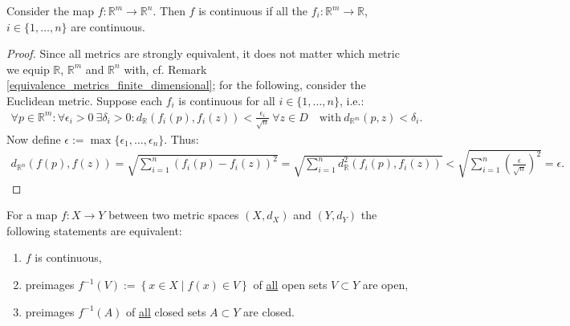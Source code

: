 \begin{lemma}\label{continuity_vector_components}
	Consider the map $f: \mathbb R^m\rightarrow\mathbb R^n$. Then $f$ is continuous if all the $f_i: \mathbb R^m\rightarrow\mathbb R$, $i\in\{1, \dots, n\}$ are continuous. 
\end{lemma}
\begin{proof}
	Since all metrics are strongly equivalent, it does not matter which metric we equip $\mathbb R$, $\mathbb R^m$ and $\mathbb R^n$ with, cf. Remark \ref{equivalence_metrics_finite_dimensional}; for the following, consider the Euclidean metric. Suppose each $f_i$ is continuous for all $i\in \{1, \dots, n\}$, i.e.: 
	\begin{align} 
		\forall p\in\mathbb R^m: \forall \epsilon_i > 0 \ \exists 
		\delta_i>0: d_{\mathbb R}(f_i(p), f_i(z)) < \frac{\epsilon_i}{\sqrt{n}} \ \forall z\in D \quad \text{with}\ d_{\mathbb R^m}(p, z) < \delta_i. 
	\end{align} 
	Now define $\epsilon:= \max\{\epsilon_1, \dots, \epsilon_n\}$. Thus: 
	\begin{align}
		d_{\mathbb R^n}(f(p), f(z)) = \sqrt{\sum_{i=1}^{n}\left(f_i(p)-f_i(z)\right)^2} 
		= \sqrt{\sum_{i=1}^{n}d^2_{\mathbb R}\left(f_i(p), f_i(z)\right)} < \sqrt{\sum_{i=1}^{n}\left(\frac{\epsilon}{\sqrt{n}}\right)^2} = \epsilon. 
	\end{align}
\end{proof}

\begin{theorem}\label{thrm:preimages_continuous_functions}
	For a map $f: X\rightarrow Y$ between two metric spaces $\left(X, d_{X} \right)$ and $\left(Y, d_{Y} \right)$ the following statements are equivalent: 
	\begin{enumerate}[label = (\roman*)]
		\item $f$ is continuous,
		\item preimages $f^{-1}(V) := \left\{ x\in X\mid f\left(x\right) \in V \right\}$ of \underline{all} open sets $V\subset Y$ are open,  
		\item preimages $f^{-1}(A)$ of \underline{all} closed sets $A\subset Y$ are closed. 	
	\end{enumerate}
\end{theorem}

